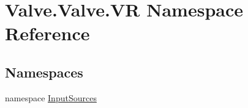 \hypertarget{namespace_valve_1_1_valve_1_1_v_r}{}\section{Valve.\+Valve.\+VR Namespace Reference}
\label{namespace_valve_1_1_valve_1_1_v_r}
\subsection*{Namespaces}
\begin{DoxyCompactItemize}
\item 
namespace \mbox{\hyperlink{namespace_valve_1_1_valve_1_1_v_r_1_1_input_sources}{Input\+Sources}}
\end{DoxyCompactItemize}
